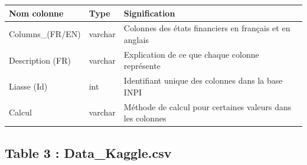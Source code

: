 \documentclass[mstat,12pt]{unswthesis}
\begin{document}
\begin{table}[H]
\centering
\scriptsize
\begin{tabular}{|p{4cm}|p{2cm}|p{9cm}|}
\hline
\textbf{Nom colonne} & \textbf{Type} & \textbf{Signification} \\
\hline
Columns\_(FR/EN) & varchar & Colonnes des états financiers en français et en anglais \\
\hline
Description (FR) & varchar & Explication de ce que chaque colonne représente \\
\hline
Liasse (Id) & int & Identifiant unique des colonnes dans la base INPI \\
\hline
Calcul & varchar & Méthode de calcul pour certaines valeurs dans les colonnes \\
\hline
\end{tabular}
\normalsize
\end{table}

\subsection{Table 3 : Data\_Kaggle.csv}\label{table-3-data_kaggle.csv}
\end{document}
